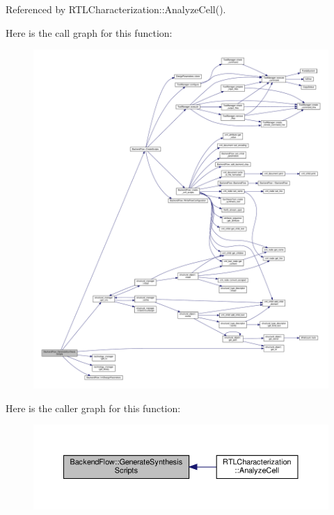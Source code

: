 Referenced by R\+T\+L\+Characterization\+::\+Analyze\+Cell().

Here is the call graph for this function\+:
\nopagebreak
\begin{figure}[H]
\begin{center}
\leavevmode
\includegraphics[width=350pt]{da/d75/classBackendFlow_a384ea03eb37c09770d9d72c013793f54_cgraph}
\end{center}
\end{figure}
Here is the caller graph for this function\+:
\nopagebreak
\begin{figure}[H]
\begin{center}
\leavevmode
\includegraphics[width=350pt]{da/d75/classBackendFlow_a384ea03eb37c09770d9d72c013793f54_icgraph}
\end{center}
\end{figure}
\mbox{\label{classBackendFlow_a419ea98a3481cb6789fc4f216ed231bb}} 
